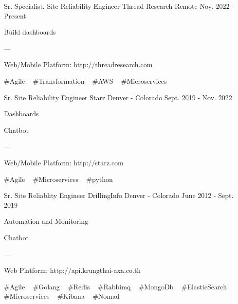 

\begin{cventries}

  \cventry
    {Sr. Specialist, Site Reliability Engineer} %
    {Thread Research} %
    {Remote} %
    {Nov. 2022 - Present} %
    {
      \begin{cvitems} %
        \item {Build dashboards}
        \item {---}
        \item {Web/Mobile Platform: http://threadresearch.com}
      \end{cvitems}
    }
    {
      \#Agile ~
      \#Transformation ~
      \#AWS ~
      \#Microservices ~
    }

  \cventry
    {Sr. Site Reliability Engineer} %
    {Starz} %
    {Denver - Colorado} %
    {Sept. 2019 - Nov. 2022} %
    {
      \begin{cvitems} %
        \item {Dashboards}
        \item {Chatbot}
        \item {---}
        \item {Web/Mobile Platform: http://starz.com}
      \end{cvitems}
    }
    {
      \#Agile ~
      \#Microservices ~
      \#python ~
    }

  \cventry
    {Sr. Site Reliablity Engineer} %
    {DrillingInfo} %
    {Denver - Colorado} %
    {June 2012 - Sept. 2019} %
    {
      \begin{cvitems} %
        \item {Automation and Monitoring}
        \item {Chatbot}
        \item {---}
        \item {Web Platform: http://api.krungthai-axa.co.th}
      \end{cvitems}
    }
    {
      \#Agile ~
      \#Golang ~
      \#Redis ~
      \#Rabbimq ~
      \#MongoDb ~
      \#ElasticSearch ~
      \#Microservices ~
      \#Kibana ~
      \#Nomad ~
    }


\end{cventries}
